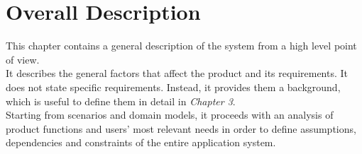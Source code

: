\chapter{Overall Description}

This chapter contains a general description of the system from a high level point of view. \\
It describes the general factors that affect the product and its requirements. It does not state specific requirements. Instead, it provides them a background, which is useful to define them in detail in \textit{Chapter 3}.\\
Starting from scenarios and domain models, it proceeds with an analysis of product functions and users' most relevant needs in order to define assumptions, dependencies and constraints of the entire application system.






